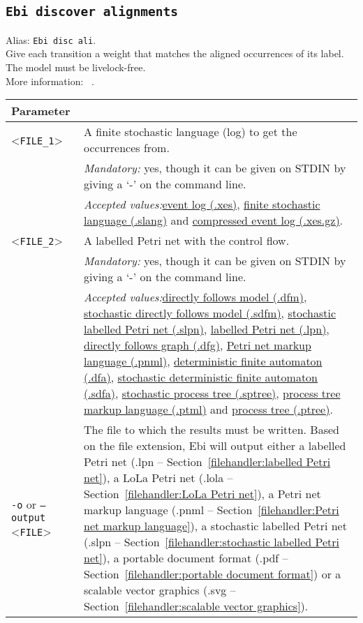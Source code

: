 {\subsection{\texttt{Ebi discover alignments}}
\label{command:Ebi discover alignments}
Alias: \texttt{Ebi disc ali}.\\
Give each transition a weight that matches the aligned occurrences of its label. The model must be livelock-free.\\
More information: ~\cite{DBLP:conf/icpm/BurkeLW20}.\\
\begin{tabularx}{\linewidth}{lX}
\toprule
Parameter \\\midrule
<\texttt{FILE\_1}>&A finite stochastic language (log) to get the occurrences from.\\
&\textit{Mandatory:} \quad yes, though it can be given on STDIN by giving a `-' on the command line.\\
&\textit{Accepted values:}\quad \hyperref[filehandler:event log]{event log (.xes)}, \hyperref[filehandler:finite stochastic language]{finite stochastic language (.slang)} and \hyperref[filehandler:compressed event log]{compressed event log (.xes.gz)}.\\
<\texttt{FILE\_2}>&A labelled Petri net with the control flow.\\
&\textit{Mandatory:} \quad yes, though it can be given on STDIN by giving a `-' on the command line.\\
&\textit{Accepted values:}\quad \hyperref[filehandler:directly follows model]{directly follows model (.dfm)}, \hyperref[filehandler:stochastic directly follows model]{stochastic directly follows model (.sdfm)}, \hyperref[filehandler:stochastic labelled Petri net]{stochastic labelled Petri net (.slpn)}, \hyperref[filehandler:labelled Petri net]{labelled Petri net (.lpn)}, \hyperref[filehandler:directly follows graph]{directly follows graph (.dfg)}, \hyperref[filehandler:Petri net markup language]{Petri net markup language (.pnml)}, \hyperref[filehandler:deterministic finite automaton]{deterministic finite automaton (.dfa)}, \hyperref[filehandler:stochastic deterministic finite automaton]{stochastic deterministic finite automaton (.sdfa)}, \hyperref[filehandler:stochastic process tree]{stochastic process tree (.sptree)}, \hyperref[filehandler:process tree markup language]{process tree markup language (.ptml)} and \hyperref[filehandler:process tree]{process tree (.ptree)}.\\
\texttt{-o} or \texttt{--output} <\texttt{FILE}> &
The file to which the results must be written. Based on the file extension, Ebi will output either a labelled Petri net (.lpn -- Section~\ref{filehandler:labelled Petri net}), a LoLa Petri net (.lola -- Section~\ref{filehandler:LoLa Petri net}), a Petri net markup language (.pnml -- Section~\ref{filehandler:Petri net markup language}), a stochastic labelled Petri net (.slpn -- Section~\ref{filehandler:stochastic labelled Petri net}), a portable document format (.pdf -- Section~\ref{filehandler:portable document format}) or a scalable vector graphics (.svg -- Section~\ref{filehandler:scalable vector graphics}).

\end{tabularx}}
